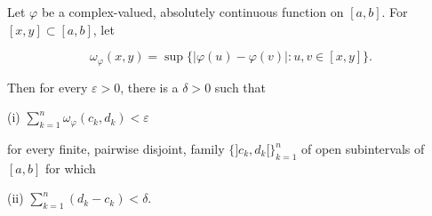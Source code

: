 Let $\varphi$ be a complex-valued, absolutely continuous function on $[a, b]$. For $[x, y] \subset [a, b]$, let

$$\omega_{\varphi}(x, y) = \sup \{ |\varphi(u) - \varphi(v)| : u, v \in [x, y] \}.$$

Then for every $\varepsilon > 0$, there is a $\delta > 0$ such that

(i) $\sum_{k=1}^{n} \omega_{\varphi}(c_k, d_k) < \varepsilon$

for every finite, pairwise disjoint, family $\{]c_k, d_k[\}_{k=1}^{n}$ of open subintervals of $[a, b]$ for which

(ii) $\sum_{k=1}^{n}(d_k - c_k) < \delta.$
